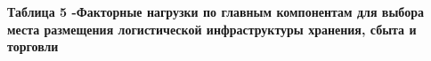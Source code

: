 {\bfseries Таблица 5 -Факторные нагрузки по главным компонентам для выбора
места размещения логистической инфраструктуры хранения, сбыта и
торговли}


